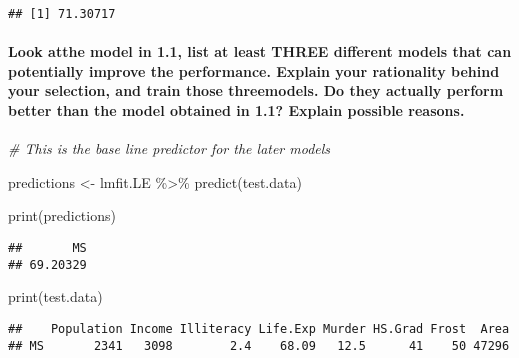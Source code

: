 \documentclass[
]{article}
\newenvironment{Shaded}{\begin{snugshade}}{\end{snugshade}}
\newcommand{\CommentTok}[1]{\textcolor[rgb]{0.56,0.35,0.01}{\textit{#1}}}
\newcommand{\FunctionTok}[1]{\textcolor[rgb]{0.00,0.00,0.00}{#1}}
\newcommand{\NormalTok}[1]{#1}
\newcommand{\OtherTok}[1]{\textcolor[rgb]{0.56,0.35,0.01}{#1}}
\newcommand{\SpecialCharTok}[1]{\textcolor[rgb]{0.00,0.00,0.00}{#1}}
\begin{document}
\begin{verbatim}
## [1] 71.30717
\end{verbatim}

\hypertarget{look-atthe-model-in-1.1-list-at-least-three-different-models-that-can-potentially-improve-the-performance.-explain-your-rationality-behind-your-selection-and-train-those-threemodels.-do-they-actually-perform-better-than-the-model-obtained-in-1.1-explain-possible-reasons.}{%
\paragraph{Look atthe model in 1.1, list at least THREE different models
that can potentially improve the performance. Explain your rationality
behind your selection, and train those threemodels. Do they actually
perform better than the model obtained in 1.1? Explain possible
reasons.}\label{look-atthe-model-in-1.1-list-at-least-three-different-models-that-can-potentially-improve-the-performance.-explain-your-rationality-behind-your-selection-and-train-those-threemodels.-do-they-actually-perform-better-than-the-model-obtained-in-1.1-explain-possible-reasons.}}

\begin{Shaded}
\begin{Highlighting}[]
\CommentTok{\# This is the base line predictor for the later models}

\NormalTok{predictions }\OtherTok{\textless{}{-}}\NormalTok{ lmfit.LE }\SpecialCharTok{\%\textgreater{}\%} \FunctionTok{predict}\NormalTok{(test.data)}

\FunctionTok{print}\NormalTok{(predictions)}
\end{Highlighting}
\end{Shaded}

\begin{verbatim}
##       MS 
## 69.20329
\end{verbatim}

\begin{Shaded}
\begin{Highlighting}[]
\FunctionTok{print}\NormalTok{(test.data)}
\end{Highlighting}
\end{Shaded}

\begin{verbatim}
##    Population Income Illiteracy Life.Exp Murder HS.Grad Frost  Area
## MS       2341   3098        2.4    68.09   12.5      41    50 47296
\end{verbatim}
\end{document}
